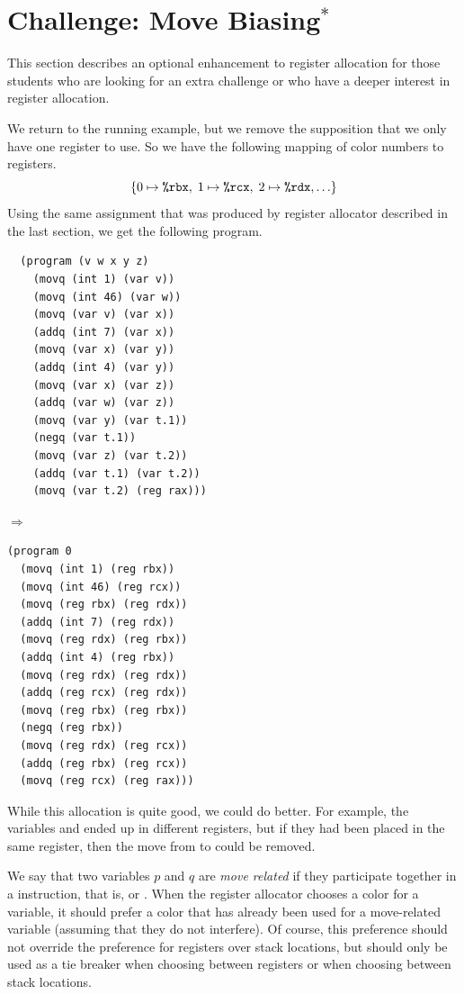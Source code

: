 \documentclass[11pt]{book}
\begin{document}
\section{Challenge: Move Biasing$^{*}$}
\label{sec:move-biasing}

This section describes an optional enhancement to register allocation
for those students who are looking for an extra challenge or who have
a deeper interest in register allocation.

We return to the running example, but we remove the supposition that
we only have one register to use. So we have the following mapping of
color numbers to registers.
\[
  \{ 0 \mapsto \texttt{\%rbx}, \; 1 \mapsto \texttt{\%rcx}, \; 2 \mapsto \texttt{\%rdx}, \ldots \}
\]
Using the same assignment that was produced by register allocator
described in the last section, we get the following program.

\begin{minipage}{0.45\textwidth}
\begin{lstlisting}
  (program (v w x y z)
    (movq (int 1) (var v))
    (movq (int 46) (var w))
    (movq (var v) (var x))
    (addq (int 7) (var x))
    (movq (var x) (var y))
    (addq (int 4) (var y))
    (movq (var x) (var z))
    (addq (var w) (var z))
    (movq (var y) (var t.1))
    (negq (var t.1))
    (movq (var z) (var t.2))
    (addq (var t.1) (var t.2))
    (movq (var t.2) (reg rax)))
\end{lstlisting}
\end{minipage}
$\Rightarrow$
\begin{minipage}{0.45\textwidth}
\begin{lstlisting}
(program 0
  (movq (int 1) (reg rbx))
  (movq (int 46) (reg rcx))
  (movq (reg rbx) (reg rdx))
  (addq (int 7) (reg rdx))
  (movq (reg rdx) (reg rbx))
  (addq (int 4) (reg rbx))
  (movq (reg rdx) (reg rdx))
  (addq (reg rcx) (reg rdx))
  (movq (reg rbx) (reg rbx))
  (negq (reg rbx))
  (movq (reg rdx) (reg rcx))
  (addq (reg rbx) (reg rcx))
  (movq (reg rcx) (reg rax)))
\end{lstlisting}
\end{minipage}

While this allocation is quite good, we could do better. For example,
the variables  and  ended up in different registers, but
if they had been placed in the same register, then the move from
 to  could be removed. 

We say that two variables $p$ and $q$ are \emph{move related} if they
participate together in a  instruction, that is,  or . When the register allocator chooses a
color for a variable, it should prefer a color that has already been
used for a move-related variable (assuming that they do not
interfere). Of course, this preference should not override the
preference for registers over stack locations, but should only be used
as a tie breaker when choosing between registers or when choosing
between stack locations.
\end{document}
